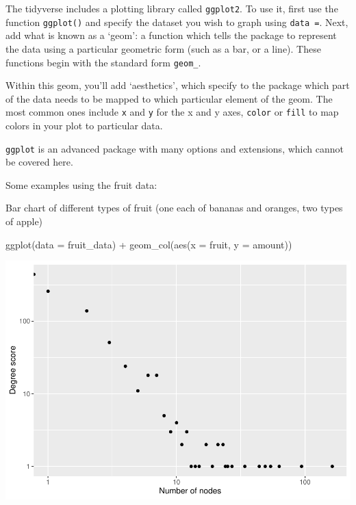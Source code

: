 \documentclass[
]{book}
\newenvironment{Shaded}{\begin{snugshade}}{\end{snugshade}}
\newcommand{\AttributeTok}[1]{\textcolor[rgb]{0.77,0.63,0.00}{#1}}
\newcommand{\FunctionTok}[1]{\textcolor[rgb]{0.00,0.00,0.00}{#1}}
\newcommand{\NormalTok}[1]{#1}
\newcommand{\SpecialCharTok}[1]{\textcolor[rgb]{0.00,0.00,0.00}{#1}}
\begin{document}
The tidyverse includes a plotting library called \texttt{ggplot2}. To use it, first use the function \texttt{ggplot()} and specify the dataset you wish to graph using \texttt{data\ =}. Next, add what is known as a `geom': a function which tells the package to represent the data using a particular geometric form (such as a bar, or a line). These functions begin with the standard form \texttt{geom\_}.

Within this geom, you'll add `aesthetics', which specify to the package which part of the data needs to be mapped to which particular element of the geom. The most common ones include \texttt{x} and \texttt{y} for the x and y axes, \texttt{color} or \texttt{fill} to map colors in your plot to particular data.

\texttt{ggplot} is an advanced package with many options and extensions, which cannot be covered here.

Some examples using the fruit data:

Bar chart of different types of fruit (one each of bananas and oranges, two types of apple)

\begin{Shaded}
\begin{Highlighting}[]
\FunctionTok{ggplot}\NormalTok{(}\AttributeTok{data =}\NormalTok{ fruit\_data) }\SpecialCharTok{+} \FunctionTok{geom\_col}\NormalTok{(}\FunctionTok{aes}\NormalTok{(}\AttributeTok{x =}\NormalTok{ fruit, }\AttributeTok{y =}\NormalTok{ amount))}
\end{Highlighting}
\end{Shaded}

\includegraphics{_main_files/figure-latex/unnamed-chunk-34-1.pdf}
\end{document}
